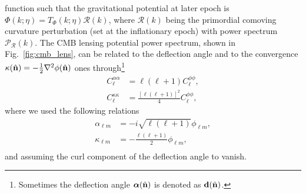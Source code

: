 function such that the gravitational potential at later epoch is $\Phi(k;\eta) = T_{\Phi}(k;\eta)\mathcal{R}(k)$, 
where $\mathcal{R}(k)$ being the primordial comoving curvature perturbation (set at the inflationary 
epoch) with power spectrum $\mathcal{P}_{\mathcal{R}}(k)$. The \gls{CMB} lensing potential power spectrum, 
shown in Fig.~\eqref{fig:cmb_lens}, can be related to the deflection angle and to the convergence 
$\kappa(\hat{\mathbf{n}})=-\frac{1}{2}\nabla^2\phi(\hat{\mathbf{n}})$ ones through\footnote{Sometimes the deflection angle 
$\bm{\alpha}(\hat{\mathbf{n}})$ is denoted as $\mathbf{d}(\hat{\mathbf{n}})$.}
%
\begin{align}
C_{\ell}^{\alpha\alpha} &= \ell(\ell+1)C_{\ell}^{\phi\phi}, \\
C_{\ell}^{\kappa\kappa} &= \frac{[\ell(\ell+1)]^2}{4}C_{\ell}^{\phi\phi},
\end{align}
%
where we used the following relations \citep{Hu2000}
%
\begin{align}
\alpha_{\ell m} &= -i\sqrt{\ell(\ell+1)}\phi_{\ell m}, \\ 
\kappa_{\ell m} &= -\frac{\ell(\ell+1)}{2}\phi_{\ell m}, \\
\end{align}
%
and assuming the curl component of the deflection angle to vanish.


